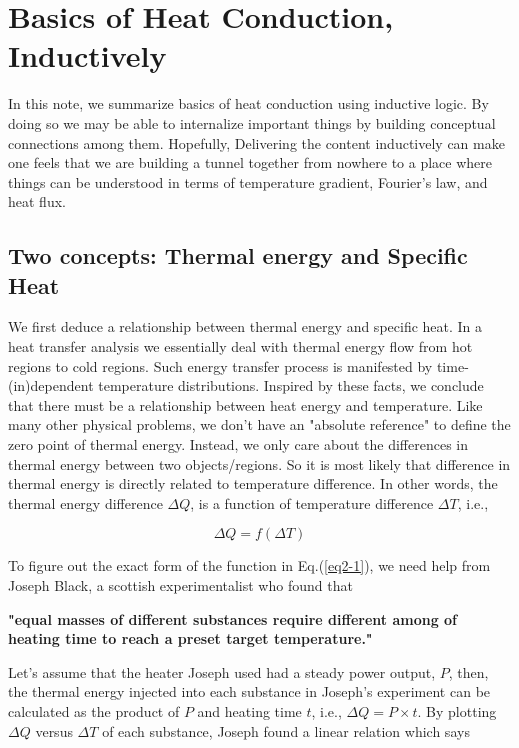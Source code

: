 \chapter{Basics of Heat Conduction, Inductively}
    In this note, we summarize basics of heat conduction using inductive logic. By doing so we may be able to internalize important things by building conceptual connections among them. Hopefully, Delivering the content inductively can make one feels that we are building a tunnel together from nowhere to a place where things can be understood in terms of temperature gradient, Fourier's law, and heat flux.

\section{Two concepts: Thermal energy and Specific Heat}
We first deduce a relationship between thermal energy and specific heat. In a heat transfer analysis we essentially deal with thermal energy flow from hot regions to cold regions. Such energy transfer process is manifested by time-(in)dependent temperature distributions. Inspired by these facts, we conclude that there must be a relationship between heat energy and temperature. Like many other physical problems, we don't have an "absolute reference" to define the zero point of thermal energy. Instead, we only care about the differences in thermal energy between two objects/regions. So it is most likely that difference in thermal energy is directly related to temperature difference. In other words, the thermal energy difference $\Delta Q$, is a function of temperature difference $\Delta T$, i.e., 

\begin{equation}
    \Delta Q = f(\Delta T)
    \label{eq2-1}
\end{equation}

To figure out the exact form of the function in Eq.(\ref{eq2-1}), we need help from Joseph Black, a scottish experimentalist who found that 
\begin{docspec}
    \textbf{"equal masses of different substances require different among of heating time to reach a preset target temperature."}
\end{docspec}

Let's assume that the heater Joseph used had a steady power output, $P$, then, the thermal energy injected into each substance in Joseph's experiment can be calculated as the product of $P$ and heating time $t$, i.e., $\Delta Q=P\times t$. By plotting $\Delta Q$ versus $\Delta T$ of each substance, Joseph found a linear relation which says

